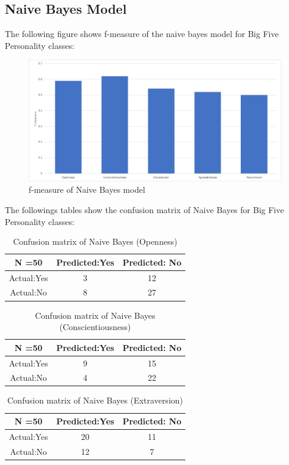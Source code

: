 \cleardoublepage
\subsection{Naive Bayes Model}
The following figure shows f-measure of the naive bayes model for Big Five Personality classes:
\begin{figure}[!ht]
\centering
\includegraphics[width = \textwidth ]{fig/f-measure_naivebayes.png}
\caption{f-measure of Naive Bayes model}
\label{fig:f-measure_naivebayes}
\end{figure}

The followings tables show the confusion matrix of Naive Bayes for Big Five Personality classes:
\begin{table}[!ht]
\centering
\begin{tabular}{ |c|c|c| }
 \hline
 N =50 & Predicted:Yes & Predicted: No \\
 \hline
 Actual:Yes&3 & 12 \\
 \hline
 Actual:No&8 & 27 \\
 \hline
\end{tabular}
\caption{Confusion matrix of Naive Bayes (Openness)}

\end{table}

\begin{table}[!ht]
\centering
\begin{tabular}{ |c|c|c| }
 \hline
 N =50 & Predicted:Yes & Predicted: No \\
 \hline
 Actual:Yes&9 & 15 \\
 \hline
 Actual:No&4 & 22 \\
 \hline
\end{tabular}
\caption{Confusion matrix of Naive Bayes (Conscientiousness)}
\end{table}

\begin{table}[!ht]
\centering
\begin{tabular}{ |c|c|c| }
 \hline
 N =50 & Predicted:Yes & Predicted: No \\
 \hline
 Actual:Yes&20 & 11 \\
 \hline
 Actual:No&12 & 7 \\
 \hline
\end{tabular}
 \caption{Confusion matrix of Naive Bayes (Extraversion)}
\end{table}

